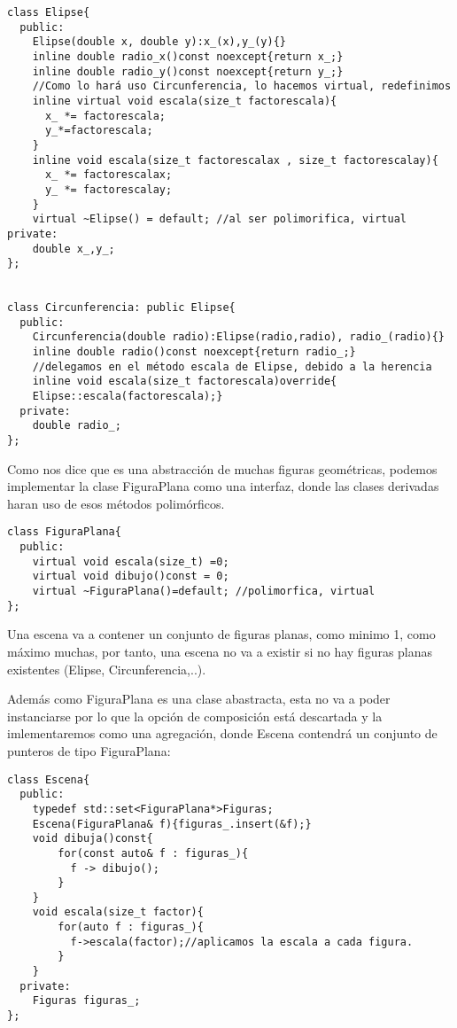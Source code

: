 \begin{verbatim}
class Elipse{
  public:
    Elipse(double x, double y):x_(x),y_(y){}
    inline double radio_x()const noexcept{return x_;}
    inline double radio_y()const noexcept{return y_;}
    //Como lo hará uso Circunferencia, lo hacemos virtual, redefinimos
    inline virtual void escala(size_t factorescala){
	  x_ *= factorescala;
	  y_*=factorescala;
    }
    inline void escala(size_t factorescalax , size_t factorescalay){
	  x_ *= factorescalax;
	  y_ *= factorescalay;
    }
    virtual ~Elipse() = default; //al ser polimorifica, virtual
private:
    double x_,y_;
};


class Circunferencia: public Elipse{
  public:
    Circunferencia(double radio):Elipse(radio,radio), radio_(radio){}
    inline double radio()const noexcept{return radio_;}
    //delegamos en el método escala de Elipse, debido a la herencia
    inline void escala(size_t factorescala)override{
	Elipse::escala(factorescala);}
  private:
    double radio_;
};
\end{verbatim}

Como nos dice que es una abstracción de muchas figuras geométricas, podemos implementar la clase FiguraPlana como una interfaz, donde las clases derivadas haran uso de esos métodos polimórficos.

\begin{verbatim}
class FiguraPlana{
  public:
    virtual void escala(size_t) =0;
    virtual void dibujo()const = 0;
    virtual ~FiguraPlana()=default; //polimorfica, virtual
};
\end{verbatim}

Una escena va a contener un conjunto de figuras planas, como minimo 1, como máximo muchas, por tanto, una escena no va a existir si no hay figuras planas existentes (Elipse, Circunferencia,..).

Además como FiguraPlana es una clase abastracta, esta no va a poder instanciarse por lo que la opción de composición está descartada y la imlementaremos como una agregación, donde Escena contendrá un conjunto de punteros de tipo FiguraPlana:

\begin{verbatim}
class Escena{
  public:
    typedef std::set<FiguraPlana*>Figuras;
    Escena(FiguraPlana& f){figuras_.insert(&f);}
    void dibuja()const{
        for(const auto& f : figuras_){
          f -> dibujo();
        }
    }
    void escala(size_t factor){
        for(auto f : figuras_){
          f->escala(factor);//aplicamos la escala a cada figura.
        }
    }
  private:
    Figuras figuras_;
};
\end{verbatim}

